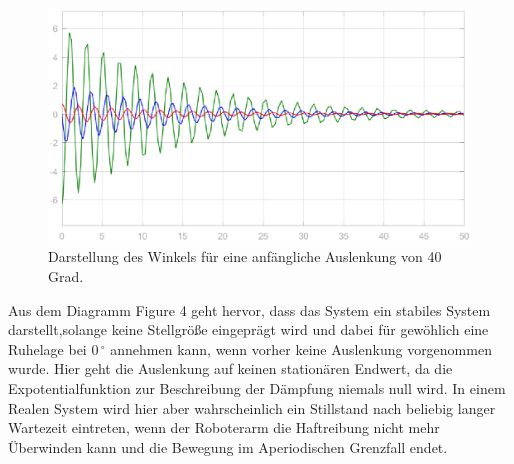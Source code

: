\documentclass[10pt]{scrartcl}
\begin{document}
\begin{figure}[H]
	\centering
	\includegraphics[width=1\textwidth]{9b}
	\caption{Darstellung des Winkels für eine anfängliche Auslenkung von 40 Grad. }
	\label{img:grafik-dummy}
\end{figure}
Aus dem Diagramm Figure 4 geht hervor, dass das System ein stabiles System darstellt,solange keine Stellgröße eingeprägt wird und dabei für gewöhlich eine Ruhelage bei 0\,$^\circ$ annehmen kann, wenn vorher keine Auslenkung vorgenommen wurde. Hier geht die Auslenkung auf keinen stationären Endwert, da die Expotentialfunktion zur Beschreibung der Dämpfung niemals null wird. In einem Realen System wird hier aber wahrscheinlich ein Stillstand nach beliebig langer Wartezeit eintreten, wenn der Roboterarm die Haftreibung nicht mehr Überwinden kann und die Bewegung im Aperiodischen Grenzfall endet.

\newpage
\end{document}
